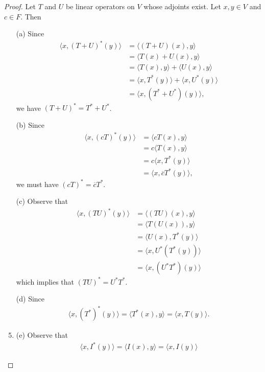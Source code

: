 \begin{proof}
Let \( T \) and \( U  \) be linear operators on \( V  \) whose adjoints exist. Let \( x,y \in V  \) and \( c \in F  \). Then
\begin{enumerate}
    \item[(a)] Since
        \begin{align*}
            \langle x , (T+U)^{*}(y) \rangle &= \langle (T+U)(x) , y  \rangle \\
                                             &= \langle T(x) + U(x) , y \rangle \\
                                             &= \langle T(x) , y  \rangle + \langle U(x) , y \rangle \\
                                             &= \langle x , T^{*}(y) \rangle + \langle x ,  U^{*}(y) \rangle \\
                                             &= \langle x , (T^{*} + U^{*})(y) \rangle,
        \end{align*}
        we have \( (T+U)^{*} = T^{*} + U^{*} \).
    \item[(b)] Since
        \begin{align*}
            \langle x , (cT)^{*}(y) \rangle &= \langle cT(x) , y \rangle \\
                                            &= c \langle T(x)   , y \rangle \\
                                            &= c \langle x  , T^{*}(y) \rangle \\
                                            &=  \langle x  ,  \overline{c} T^{*}(y) \rangle,
        \end{align*}
        we must have \( (cT)^{*} = \overline{c} T^{*} \).
    \item[(c)] Observe that
        \begin{align*}
            \langle x , (TU)^{*}(y) \rangle &= \langle (TU)(x) , y \rangle \\
                                            &= \langle T(U(x)) , y \rangle \\
                                            &= \langle U(x) , T^{*}(y) \rangle \\
                                            &= \langle x  ,  U^{*}(T^{*}(y)) \rangle \\
                                            &= \langle x , (U^{*}T^{*})(y) \rangle
        \end{align*}
        which implies that \(  (TU)^{*} = U^{*} T^{*} \).
    \item[(d)] Since
        \begin{align*}
            \langle x , (T^{*})^{*}(y) \rangle = \langle T^{*}(x) , y  \rangle 
                                               = \langle x , T(y) \rangle.
        \end{align*}
    \item{(e)} Observe that
        \begin{align*}
            \langle x , I^{*}(y) \rangle = \langle I(x) , y  \rangle = \langle x  ,  I(y) \rangle
        \end{align*}
\end{enumerate}
\end{proof}


